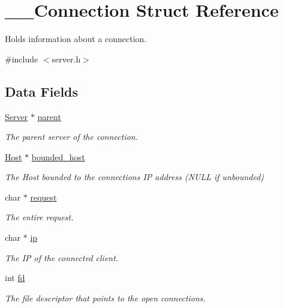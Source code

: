 \hypertarget{struct_____connection}{}\section{\+\_\+\+\_\+\+Connection Struct Reference}
\label{struct_____connection}


Holds information about a connection.  




{\ttfamily \#include $<$server.\+h$>$}

\subsection*{Data Fields}
\begin{DoxyCompactItemize}
\item 
\mbox{\hyperlink{server_8h_a705d964b8a67edeeb3943273a397e4c2}{Server}} $\ast$ \mbox{\hyperlink{struct_____connection_ad4b092dd27ad2126d0a6ee313e14c430}{parent}}
\begin{DoxyCompactList}\small\item\em The parent server of the connection. \end{DoxyCompactList}\item 
\mbox{\hyperlink{host_8h_a30ca67c0ed1f344be0c570271ecfc489}{Host}} $\ast$ \mbox{\hyperlink{struct_____connection_a141d30c3e0a43c1a460797bfd4e4d581}{bounded\+\_\+host}}
\begin{DoxyCompactList}\small\item\em The Host bounded to the connections IP address (N\+U\+LL if unbounded) \end{DoxyCompactList}\item 
char $\ast$ \mbox{\hyperlink{struct_____connection_aee994fd59229c469bc2489350a981590}{request}}
\begin{DoxyCompactList}\small\item\em The entire request. \end{DoxyCompactList}\item 
char $\ast$ \mbox{\hyperlink{struct_____connection_a4612124e8b89da32e748c7a5377ad554}{ip}}
\begin{DoxyCompactList}\small\item\em The IP of the connected client. \end{DoxyCompactList}\item 
int \mbox{\hyperlink{struct_____connection_a49433c1edd3dd2f86a724047f9de2414}{fd}}
\begin{DoxyCompactList}\small\item\em The file descriptor that points to the open connections. \end{DoxyCompactList}\item 

\end{DoxyCompactItemize}
